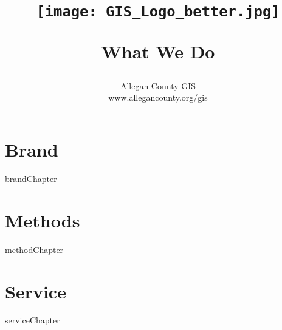 \documentclass{book}
\title{\HRule \\[.4cm] 
\begin{figure}[H] %
\begin{center}	 
	\texttt{[image: GIS\_Logo\_better.jpg]}
	\end{center}
	\end{figure}
	\Huge \bfseries What We Do
\HRule \\[.4cm]
}
\author{\Large Allegan County GIS \\\Large www.allegancounty.org/gis}
\newcommand*{\MyPath}{../processing}
\begin{document}
\frontmatter
\maketitle
\tableofcontents
\mainmatter
\pagebreak

\part{Brand}
{brandChapter}

%
%

\part{Methods}
{methodChapter}


%


%
%
\part{Service}
{serviceChapter}

%
%
\end{document}
